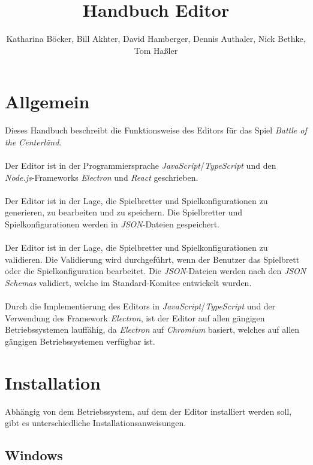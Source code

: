 \documentclass[12pt]{gruppe-11-article-a5}
\title{Handbuch Editor}
\author{Katharina Böcker, Bill Akhter, David Hamberger, Dennis Authaler, Nick Bethke, Tom Haßler}
\begin{document}
\maketitle
\tableofcontents
\newpage
\hypersetup{
	colorlinks=true,
	linkcolor=linkcolor,
	filecolor=magenta,
	urlcolor=urlcolor,
}


\section{Allgemein}\label{sec:allgemein2}

Dieses Handbuch beschreibt die Funktionsweise des Editors für das Spiel \emph{Battle of the Centerländ}.
\\\\
Der Editor ist in der Programmiersprache \emph{JavaScript}/\emph{TypeScript} und den \emph{Node.js}-Frameworks \emph{Electron} und \emph{React} geschrieben.
\\\\
Der Editor ist in der Lage, die Spielbretter und Spielkonfigurationen zu generieren, zu bearbeiten und zu speichern.
Die Spielbretter und Spielkonfigurationen werden in \emph{JSON}-Dateien gespeichert.
\\\\
Der Editor ist in der Lage, die Spielbretter und Spielkonfigurationen zu validieren.
Die Validierung wird durchgeführt, wenn der Benutzer das Spielbrett oder die Spielkonfiguration bearbeitet.
Die \emph{JSON}-Dateien werden nach den \emph{JSON Schemas} validiert, welche im Standard-Komitee entwickelt wurden.
\\\\
Durch die Implementierung des Editors in \emph{JavaScript}/\emph{TypeScript} und der Verwendung des Framework \emph{Electron}, ist der Editor auf allen gängigen Betriebssystemen lauffähig, da \emph{Electron} auf \emph{Chromium} basiert, welches auf allen gängigen Betriebssystemen verfügbar ist.


\section{Installation}\label{sec:installation}

Abhängig von dem Betriebssystem, auf dem der Editor installiert werden soll, gibt es unterschiedliche Installationsanweisungen.

\subsection{Windows}\label{subsec:windows}
\end{document}
